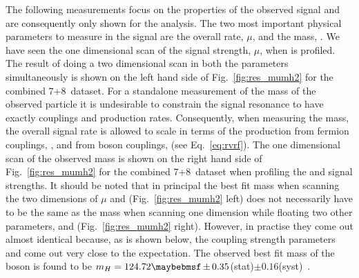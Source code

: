 The following measurements focus on the properties of the observed signal and are consequently only shown for the \MFM analysis. The two most important physical parameters to measure in the signal are the overall rate, $\mu$, and the mass, \mH. We have seen the one dimensional \NLL scan of the signal strength, $\mu$, when \mH is profiled. The result of doing a two dimensional \NLL scan in both the parameters simultaneously is shown on the left hand side of Fig.~\ref{fig:res_mumh2} for the combined 7+8~\TeV dataset. For a standalone measurement of the mass of the observed particle it is undesirable to constrain the signal resonance to have exactly \SM couplings and production rates. Consequently, when measuring the mass, the overall signal rate is allowed to scale in terms of the production from fermion couplings, \RF, and from boson couplings, \RV (see Eq.~\ref{eq:rvrf}). The one dimensional \NLL scan of the observed mass is shown on the right hand side of Fig.~\ref{fig:res_mumh2} for the combined 7+8~\TeV dataset when profiling the \RV and \RF signal strengths. It should be noted that in principal the best fit mass when scanning the two dimensions of $\mu$ and \mH (Fig.~\ref{fig:res_mumh2} left) does not necessarily have to be the same as the mass when scanning one dimension \mH while floating two other parameters, \RV and \RF (Fig.~\ref{fig:res_mumh2} right). However, in practise they come out almost identical because, as is shown below, the coupling strength parameters \RV and \RF come out very close to the \SM expectation. The observed best fit mass of the boson is found to be $\mH=124.72\pm0.35$(stat)$\pm0.16$(syst)~\GeV. 

